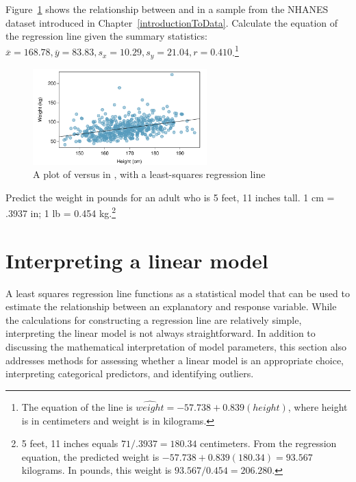 \begin{exercise}
Figure~\ref{nhanesHeightWeightRegress} shows the relationship between  and  in a sample from the NHANES dataset introduced in Chapter~\ref{introductionToData}. Calculate the equation of the regression line given the summary statistics: $\overline{x} = 168.78, \overline{y} = 83.83, s_{x} = 10.29, s_{y} = 21.04, r = 0.410$.\footnote{The equation of the line is $\widehat{weight} = -57.738 + 0.839(height)$, where height is in centimeters and weight is in kilograms.}

\begin{figure}[h!] 
	\centering
	\includegraphics[width=0.6\textwidth]
	{ch_simple_linear_regression_oi_biostat/figures/nhanesHeightWeightRegress/nhanesHeightWeightRegress}
	\caption{A plot of  versus  in , with a least-squares regression line}
	\label{nhanesHeightWeightRegress}
\end{figure}

	
\end{exercise}

\begin{exercise} \label{predictingNHANESWeightfrmHeightMetric}
Predict the weight in pounds for an adult who is 5 feet, 11 inches tall. 1 cm = .3937 in; 1 lb = 0.454 kg.\footnote{5 feet, 11 inches equals $71/.3937 = 180.34$ centimeters. From the regression equation, the predicted weight is $-57.738 + 0.839(180.34) = 93.567$ kilograms. In pounds, this weight is $93.567/0.454 = 206.280$.}
\end{exercise}


\newpage


\section{Interpreting a linear model}
\label{interpretingLeastSquaresLine}

A least squares regression line functions as a statistical model that can be used to estimate the relationship between an explanatory and response variable. While the calculations for constructing a regression line are relatively simple, interpreting the linear model is not always straightforward. In addition to discussing the mathematical interpretation of model parameters, this section also addresses methods for assessing whether a linear model is an appropriate choice, interpreting categorical predictors, and identifying outliers.

